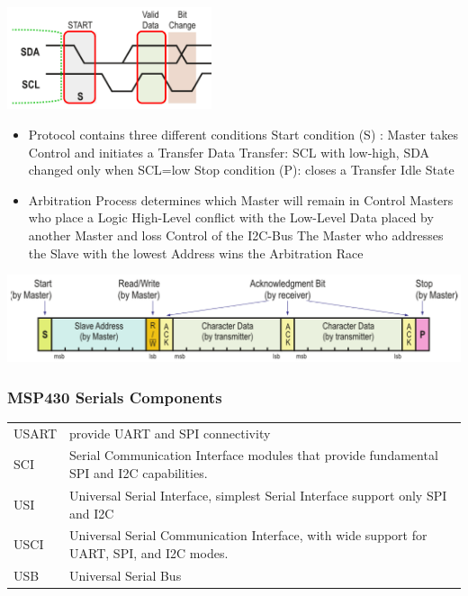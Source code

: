 \includegraphics[width=6cm]{images/i2c_2.png}\\
\begin{minipage}{\linewidth}
	\begin{itemize}
		\item Protocol contains three different conditions
		\subitem Start condition (S) : Master takes Control and initiates a Transfer
		\subitem Data Transfer: \acs{SCL} with low-high, \acs{SDA} changed only when SCL=low
		\subitem Stop condition (P): closes a Transfer
		\subitem Idle State
		\item Arbitration Process determines which Master will remain in Control
		\subitem Masters who place a Logic High-Level conflict with the Low-Level Data placed by another Master and loss Control of the \acs{I2C}-Bus
		\subitem The Master who addresses the Slave with the lowest Address wins the Arbitration Race
	\end{itemize}
\end{minipage}

\includegraphics[width=16cm]{images/i2c_data.png}\\


\subsubsection{MSP430 Serials Components}
\begin{tabular}{ll}
    \acs{USART} &
    provide \acs{UART} and \acs{SPI} connectivity\\
    
    \acs{SCI} &
	Serial Communication Interface modules that provide fundamental \acs{SPI} and \acs{I2C} capabilities.\\
    
	\acs{USI} &
	Universal Serial Interface, simplest Serial Interface support only \acs{SPI} and \acs{I2C}\\
    
	\acs{USCI} &
	Universal Serial Communication Interface, with wide support for \acs{UART}, \acs{SPI}, and \acs{I2C} modes.\\
    
	\acs{USB} & Universal Serial Bus\\
    
\end{tabular}
\clearpage
\pagebreak
